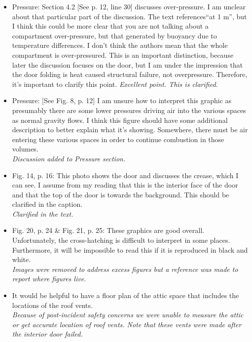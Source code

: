 \documentclass[12pt]{article}
\begin{document}
\begin{itemize}
\item Pressure: Section 4.2 [See p. 12, line 30] discusses over-pressure. I am unclear about that particular part of the discussion. The text references``at 1 m'', but I think this could be more clear that you are not talking about a compartment over-pressure, but that generated by buoyancy due to temperature differences. I don't think the authors mean that the whole compartment is over-pressured. This is an important distinction, because later the discussion focuses on the door, but I am under the impression that the door folding is heat caused structural failure, not overpressure. Therefore, it's important to clarify this point.
{\it Excellent point. This is clarified.}
\item Pressure: [See Fig. 8, p. 12] I am unsure how to interpret this graphic as presumably there are some lower pressures driving air into the various spaces as normal gravity flows. I think this figure should have some additional description to better explain what it's showing. Somewhere, there must be air entering these various spaces in order to continue combustion in those volumes. \\
{\it Discussion added to Pressure section.}
\item Fig. 14, p. 16: This photo shows the door and discusses the crease, which I can see. I assume from my reading that this is the interior face of the door and that the top of the door is towards the background. This should be clarified in the caption. \\
{\it Clarified in the text.}
\item Fig. 20, p. 24 \& Fig. 21, p. 25: These graphics are good overall. Unfortunately, the cross-hatching is difficult to interpret in some places. Furthermore, it will be impossible to read this if it is reproduced in black and white. \\
{\it Images were removed to address excess figures but a reference was made to report where figures live.}
\item  It would be helpful to have a floor plan of the attic space that includes the locations of the roof vents. \\
{\it Because of post-incident safety concerns we were unable to measure the attic or get accurate location of roof vents. Note that these vents were made after the interior door failed.}
\end{itemize}
\end{document}
